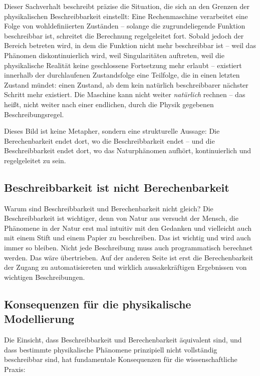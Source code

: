 ﻿\documentclass[12pt, a4paper]{article}
\begin{document}
	Dieser Sachverhalt beschreibt präzise die Situation, die sich an den Grenzen der physikalischen Beschreibbarkeit einstellt: Eine Rechenmaschine verarbeitet eine Folge von wohldefiniierten Zuständen -- solange die zugrundeliegende Funktion beschreibbar ist, schreitet die Berechnung regelgeleitet fort. Sobald jedoch der Bereich betreten wird, in dem die Funktion nicht mehr beschreibbar ist -- weil das Phänomen diskontinuierlich wird, weil Singularitäten auftreten, weil die physikalische Realität keine geschlossene Fortsetzung mehr erlaubt -- existiert innerhalb der durchlaufenen Zustandsfolge eine Teilfolge, die in einen letzten Zustand mündet: einen Zustand, ab dem kein natürlich beschreibbarer nächster Schritt mehr existiert. Die Maschine kann nicht weiter \textit{natürlich} rechnen -- das heißt, nicht weiter nach einer endlichen, durch die Physik gegebenen Beschreibungsregel.

	Dieses Bild ist keine Metapher, sondern eine strukturelle Aussage: Die Berechenbarkeit endet dort, wo die Beschreibbarkeit endet -- und die Beschreibbarkeit endet dort, wo das Naturphänomen aufhört, kontinuierlich und regelgeleitet zu sein.
	
	\subsection{Beschreibbarkeit ist nicht Berechenbarkeit}
	
	Warum sind Beschreibbarkeit und Berechenbarkeit nicht gleich? Die Beschreibbarkeit ist wichtiger, denn von Natur aus versucht der Mensch, die Phänomene in der Natur erst mal intuitiv mit den Gedanken und vielleicht auch mit einem Stift und einem Papier zu beschreiben. Das ist wichtig und wird auch immer so bleiben. Nicht jede Beschreibung muss auch programmatisch berechnet werden. Das wäre übertrieben. Auf der anderen Seite ist erst die Berechenbarkeit der Zugang zu automatisiereten und wirklich aussakekräftigen Ergebnissen von wichtigen Beschreibungen.

	\subsection{Konsequenzen für die physikalische Modellierung}

	Die Einsicht, dass Beschreibbarkeit und Berechenbarkeit äquivalent sind, und dass bestimmte physikalische Phänomene prinzipiell nicht vollständig beschreibbar sind, hat fundamentale Konsequenzen für die wissenschaftliche Praxis:
\end{document}
